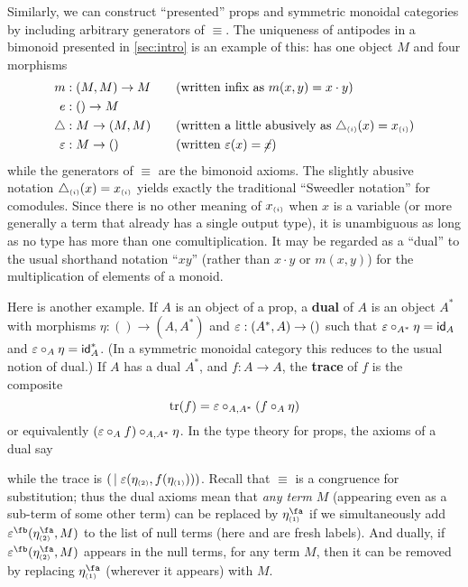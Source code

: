 \begin{props}
\newpage

Similarly, we can construct ``presented'' props and symmetric monoidal categories by including arbitrary generators of $\equiv$.
The uniqueness of antipodes in a bimonoid presented in \cref{sec:intro} is an example of this: \cG has one object $M$ and four morphisms
\begin{alignat*}{2}
m&:(M,M)\to M &&\quad\text{(written infix as $m(x,y) = x\cdot y$)}\\
e&:()\to M\\
\triangle&:M\to (M,M) &&\quad\text{(written a little abusively as $\triangle_{\scriptscriptstyle(i)}(x) = x_{\scriptscriptstyle(i)}$)}\\
\varepsilon &:M\to () &&\quad\text{(written $\varepsilon(x) = \cancel{x}$)}
\end{alignat*}
while the generators of $\equiv$ are the bimonoid axioms.
The slightly abusive notation $\triangle_{\scriptscriptstyle(i)}(x) = x_{\scriptscriptstyle(i)}$ yields exactly the traditional ``Sweedler notation'' for comodules.
Since there is no other meaning of $x_{\scriptscriptstyle(i)}$ when $x$ is a variable (or more generally a term that already has a single output type), it is unambiguous as long as no type has more than one comultiplication.
It may be regarded as a ``dual'' to the usual shorthand notation ``$x y$'' (rather than $x\cdot y$ or $m(x,y)$) for the multiplication of elements of a monoid.

Here is another example.
If $A$ is an object of a prop, a \textbf{dual} of $A$ is an object $A^*$ with morphisms $\eta:()\to (A,A^*)$ and $\varepsilon:(A^*,A)\to ()$ such that $\varepsilon \circ_{A^*} \eta = \mathsf{id}_A$ and $\varepsilon \circ_{A} \eta = \mathsf{id}_A^*$.
(In a symmetric monoidal category this reduces to the usual notion of dual.)
If $A$ has a dual $A^*$, and $f:A\to A$, the \textbf{trace} of $f$ is the composite
\[ \mathrm{tr}(f) = \varepsilon \circ_{A,A^*} (f \circ_A \eta) \]
or equivalently $(\varepsilon \circ_A f)\circ_{A,A^*} \eta$.
In the type theory for props, the axioms of a dual say
while the trace is $(\,\mid \varepsilon(\eta_{\scriptscriptstyle(2)},f(\eta_{\scriptscriptstyle(1)})))$.
Recall that $\equiv$ is a congruence for substitution; thus the dual axioms mean that \emph{any term} $M$ (appearing even as a sub-term of some other term) can be replaced by $\eta\s1^\fa$ if we simultaneously add $\counit^\fb(\eta\s2^\fa,M)$ to the list of null terms (here \fa and \fb are fresh labels).
And dually, if $\counit^\fb(\eta\s2^\fa,M)$ appears in the null terms, for any term $M$, then it can be removed by replacing $\eta\s1^\fa$ (wherever it appears) with $M$.


\end{props}
